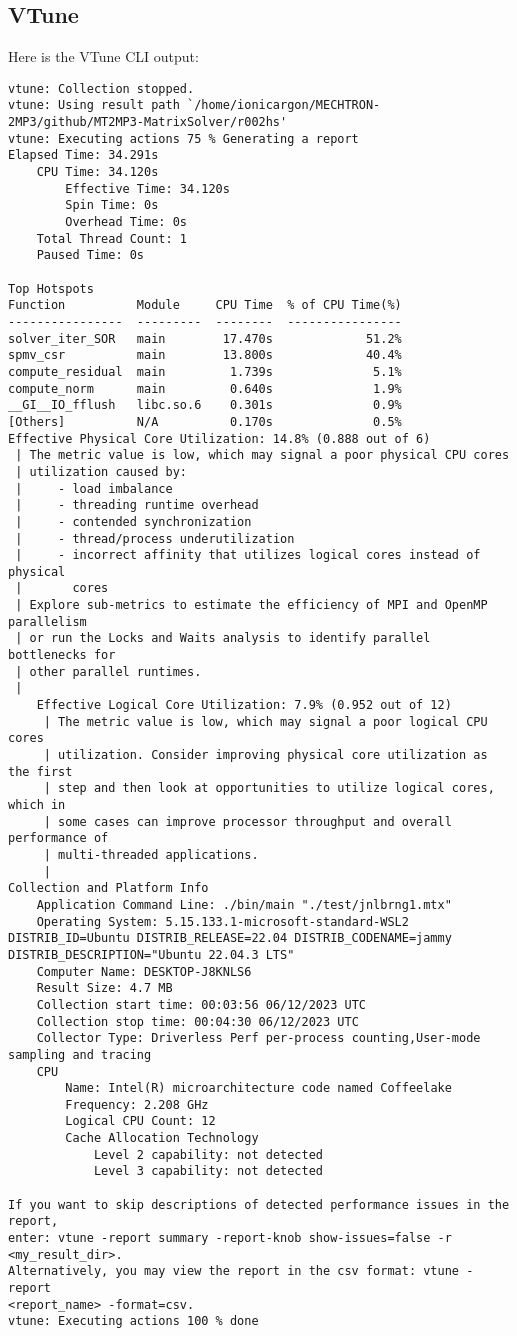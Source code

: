 \documentclass[12pt]{article}
\begin{document}
    \subsection{VTune}
    Here is the VTune CLI output:
    \begin{verbatim}
vtune: Collection stopped.
vtune: Using result path `/home/ionicargon/MECHTRON-2MP3/github/MT2MP3-MatrixSolver/r002hs'
vtune: Executing actions 75 % Generating a report                              Elapsed Time: 34.291s
    CPU Time: 34.120s
        Effective Time: 34.120s
        Spin Time: 0s
        Overhead Time: 0s
    Total Thread Count: 1
    Paused Time: 0s

Top Hotspots
Function          Module     CPU Time  % of CPU Time(%)
----------------  ---------  --------  ----------------
solver_iter_SOR   main        17.470s             51.2%
spmv_csr          main        13.800s             40.4%
compute_residual  main         1.739s              5.1%
compute_norm      main         0.640s              1.9%
__GI__IO_fflush   libc.so.6    0.301s              0.9%
[Others]          N/A          0.170s              0.5%
Effective Physical Core Utilization: 14.8% (0.888 out of 6)
 | The metric value is low, which may signal a poor physical CPU cores
 | utilization caused by:
 |     - load imbalance
 |     - threading runtime overhead
 |     - contended synchronization
 |     - thread/process underutilization
 |     - incorrect affinity that utilizes logical cores instead of physical
 |       cores
 | Explore sub-metrics to estimate the efficiency of MPI and OpenMP parallelism
 | or run the Locks and Waits analysis to identify parallel bottlenecks for
 | other parallel runtimes.
 |
    Effective Logical Core Utilization: 7.9% (0.952 out of 12)
     | The metric value is low, which may signal a poor logical CPU cores
     | utilization. Consider improving physical core utilization as the first
     | step and then look at opportunities to utilize logical cores, which in
     | some cases can improve processor throughput and overall performance of
     | multi-threaded applications.
     |
Collection and Platform Info
    Application Command Line: ./bin/main "./test/jnlbrng1.mtx" 
    Operating System: 5.15.133.1-microsoft-standard-WSL2 DISTRIB_ID=Ubuntu DISTRIB_RELEASE=22.04 DISTRIB_CODENAME=jammy DISTRIB_DESCRIPTION="Ubuntu 22.04.3 LTS"
    Computer Name: DESKTOP-J8KNLS6
    Result Size: 4.7 MB 
    Collection start time: 00:03:56 06/12/2023 UTC
    Collection stop time: 00:04:30 06/12/2023 UTC
    Collector Type: Driverless Perf per-process counting,User-mode sampling and tracing
    CPU
        Name: Intel(R) microarchitecture code named Coffeelake
        Frequency: 2.208 GHz
        Logical CPU Count: 12
        Cache Allocation Technology
            Level 2 capability: not detected
            Level 3 capability: not detected

If you want to skip descriptions of detected performance issues in the report,
enter: vtune -report summary -report-knob show-issues=false -r <my_result_dir>.
Alternatively, you may view the report in the csv format: vtune -report
<report_name> -format=csv.
vtune: Executing actions 100 % done    
    \end{verbatim}
\end{document}
